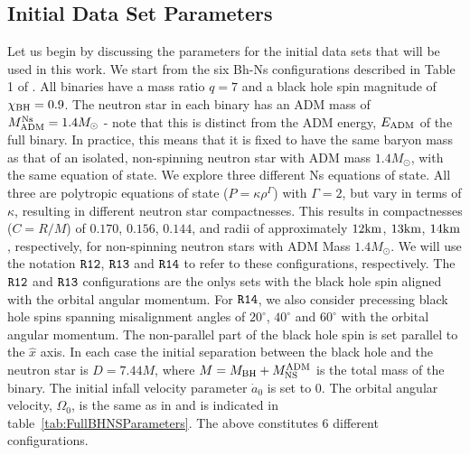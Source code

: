 \subsection{Initial Data Set Parameters}
Let us begin by discussing the parameters for the initial data sets
that will be used in this work. We start from the six Bh-Ns
configurations described in Table 1 of \cite{Foucart:2013a}. All
binaries have a mass ratio $q=7$ and a black hole spin magnitude of
$\chi_{\rm BH}=0.9$. The neutron star in each binary has
an ADM mass of $M^{\rm Ns}_{\rm ADM}=1.4M_{\odot}$ - note that this is
distinct from the ADM energy, $E_{\rm ADM}$ of the full binary. In
practice, this means that it is fixed to have the same baryon mass as
that of an isolated, non-spinning neutron star with ADM mass
$1.4M_{\odot}$, with the same equation of state. We explore three
different Ns equations of state. All three are polytropic equations of
state ($P=\kappa\rho^\Gamma$) with $\Gamma=2$, but vary in terms of
$\kappa$, resulting in different neutron star compactnesses. This results
in compactnesses ($C=R/M$) of $0.170$, $0.156$, $0.144$, and radii of
approximately $12{\rm km}$, $13{\rm km}$, $14{\rm km}$, respectively, for non-spinning
neutron stars with ADM Mass $1.4M_{\odot}$. We will use the notation
${\tt R12}$, ${\tt R13}$ and ${\tt R14}$ to refer to these configurations,
respectively. The ${\tt R12}$ and ${\tt R13}$ configurations are the onlys sets
with the black hole spin aligned with the orbital angular
momentum. For ${\tt R14}$, we also consider precessing
black hole spins spanning misalignment angles of $20^{\circ}$, $40^{\circ}$ and
$60^{\circ}$ with the orbital angular momentum. The non-parallel part of the black hole spin is set
parallel to the $\hat{x}$ axis. In each case the initial separation
between the black hole and the neutron star is $D=7.44M$, where
$M=M_{\rm BH}+M^{\rm ADM}_{\rm NS}$ is the total mass of the
binary. The initial infall velocity parameter $\dot{a}_0$ is set to
$0$. The orbital angular velocity, $\Omega_0$, is the same as in \cite{Foucart:2013a} and is indicated in table~\ref{tab:FullBHNSParameters}.
The above constitutes 6 different configurations. 


